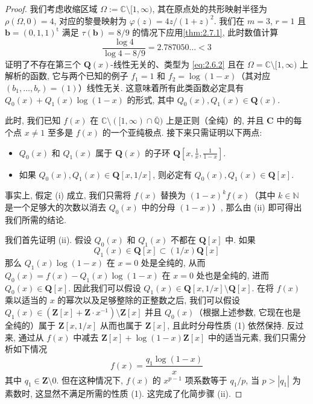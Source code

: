 \begin{proof}
我们考虑收缩区域 \(\Omega := \mathbb{C} \setminus [1, \infty)\), 其在原点处的共形映射半径为 \(\rho(\Omega,0)=4\), 对应的黎曼映射为 \(\varphi(z)=4z/(1+z)^2\). 
我们在 \(m=3\), \(r=1\) 且 \(\mathbf{b}=(0,1,1)^{\mathrm{t}}\) 满足 \(\tau(\mathbf{b})=8/9\) 的情况下应用\autoref{thm:2.7.1}, 此时数值计算
\begin{equation}\label{eq:2.7.3}
\frac{\log 4}{\log 4 - 8/9} = 2.787050 \dots < 3
\end{equation}
证明了不存在第三个 \(\mathbf{Q}(x)\)-线性无关的、类型为 \eqref{eq:2.6.2} 且在 \(\Omega = \mathbb{C} \setminus [1, \infty)\) 上解析的函数, 它与两个已知的例子 \(f_1 = 1\) 和 \(f_2 = \log(1-x)\)（其对应 \((b_1, \ldots, b_r) = (1)\)）线性无关. 
这意味着所有此类函数必定具有 \(Q_0(x) + Q_1(x) \log(1-x)\) 的形式, 其中 \(Q_0(x), Q_1(x) \in \mathbf{Q}(x)\).

此时, 我们已知 \(f(x)\) 在 \(\mathbb{C} \setminus ([1, \infty) \cap \overline{\mathbb{Q}})\) 上是正则（全纯）的, 并且 \(\mathbf{C}\) 中的每个点 \(x \neq 1\) 至多是 \(f(x)\) 的一个亚纯极点. 接下来只需证明以下两点:
\begin{itemize}
  \item[(i)] \(Q_0(x)\) 和 \(Q_1(x)\) 属于 \(\mathbf{Q}(x)\) 的子环 \(\mathbf{Q}\left[x, \frac{1}{x}, \frac{1}{1-x}\right]\).
  \item[(ii)] 如果 \(Q_0(x), Q_1(x) \in \mathbf{Q}[x, 1/x]\), 则必定有 \(Q_0(x), Q_1(x) \in \mathbf{Q}[x]\).
\end{itemize}
事实上, 假定 (i) 成立, 我们只需将 \(f(x)\) 替换为 \((1-x)^k f(x)\)（其中 \(k \in \mathbb{N}\) 是一个足够大的次数以消去 \(Q_0(x)\) 中的分母 \((1-x)\)）, 那么由 (ii) 即可得出我们所需的结论.

我们首先证明 (ii). 假设 \(Q_0(x)\) 和 \(Q_1(x)\) 不都在 \(\mathbf{Q}[x]\) 中. 如果
\[ Q_1(x) \in \mathbf{Q}[x] \subset (1/x)\mathbf{Q}[x] \]
那么 \(Q_1(x) \log(1-x)\) 在 \(x=0\) 处是全纯的, 从而 \(Q_0(x)=f(x)-Q_1(x)\log(1-x)\) 在 \(x=0\) 处也是全纯的, 进而 \(Q_0(x)\in \mathbf{Q}[x]\). 
因此我们可以假设 \(Q_1(x) \in \mathbf{Q}[x, 1/x] \setminus \mathbf{Q}[x]\). 
在将 \(f(x)\) 乘以适当的 \(x\) 的幂次以及足够整除的正整数之后, 我们可以假设 \(Q_1(x) \in (\mathbf{Z}[x] + \mathbf{Z} \cdot x^{-1}) \setminus \mathbf{Z}[x]\) 并且 \(Q_0(x)\)（根据上述参数, 它现在也是全纯的）属于 \(\mathbf{Z}[x, 1/x]\) 从而也属于 \(\mathbf{Z}[x]\), 且此时分母性质 (1) 依然保持. 
反过来, 通过从 \(f(x)\) 中减去 \( \mathbf{Z}[x] + \log(1-x)\mathbf{Z}[x] \) 中的适当元素, 我们只需分析如下情况
\[ f(x) = \frac{q_1 \log(1-x)}{x} \]
其中 \(q_1 \in \mathbf{Z} \setminus 0\). 
但在这种情况下, \(f(x)\) 的 \(x^{p-1}\) 项系数等于 \(q_1/p\), 当 \(p > |q_1|\) 为素数时, 这显然不满足所需的性质 (1). 这完成了化简步骤 (ii).


\end{proof}
